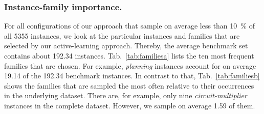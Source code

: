 \documentclass[runningheads]{llncs}
\begin{document}
\subsubsection{Instance-family importance.}
For all configurations of our approach that sample on average less than \SI{10}{\%} of all 5355 instances, we look at the particular instances and families that are selected by our active-learning approach.
Thereby, the average benchmark set contains about \SI{192.34}{} instances.
Tab.~\ref{tab:familiesa} lists the ten most frequent families that are chosen.
For example, \emph{planning} instances account for on average \SI{19.14}{} of the \SI{192.34}{} benchmark instances.
In contrast to that, Tab.~\ref{tab:familiesb} shows the families that are sampled the most often relative to their occurrences in the underlying dataset.
There are, for example, only nine \emph{circuit-multiplier} instances in the complete dataset.
However, we sample on average \SI{1.59}{} of them.

\end{document}

